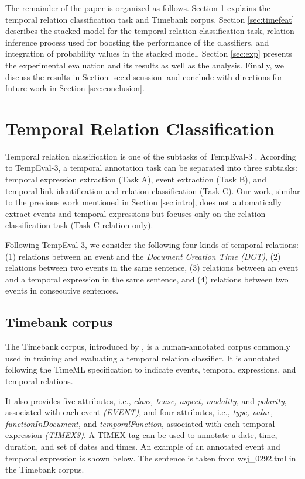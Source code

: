\documentclass[english]{jnlp_1.4}
\begin{document}
The remainder of the paper is organized as follows.
Section \ref{sec:trc} explains the temporal relation classification task and Timebank corpus.
Section \ref{sec:timefeat} describes the stacked model for the temporal relation classification task, relation inference process used for boosting the performance of the classifiers, and integration of probability values in the stacked model.
Section \ref{sec:exp} presents the experimental evaluation and its results as well as the analysis.
Finally, we discuss the results in Section \ref{sec:discussion} and conclude with directions for future work in Section \ref{sec:conclusion}.


\section{Temporal Relation Classification}
\label{sec:trc}

Temporal relation classification is one of the subtasks of TempEval-3 \cite{naushad2013}.
According to TempEval-3, a temporal annotation task can be separated into three subtasks: temporal expression extraction (Task A), event extraction (Task B), and temporal link identification and relation classification (Task C). 
Our work, similar to the previous work mentioned in Section \ref{sec:intro}, does not automatically extract events and temporal expressions but focuses only on the relation classification task (Task C-relation-only).

Following TempEval-3, we consider the following four kinds of temporal relations: 
(1) relations between an event and the \textit{Document Creation Time (DCT)}, 
(2) relations between two events in the same sentence, 
(3) relations between an event and a temporal expression in the same sentence, and 
(4) relations between two events in consecutive sentences.


\subsection{Timebank corpus}
\label{subsec:tb}

The Timebank corpus, introduced by , is a human-annotated corpus commonly used in training and evaluating a temporal relation classifier.
It is annotated following the TimeML specification to indicate events, temporal expressions, and temporal relations.

It also provides five attributes, i.e., \textit{class, tense, aspect, modality,} and \textit{polarity}, associated with each event \textit{\small (EVENT)}, and four attributes, i.e., \textit{type, value, functionInDocument,} and \textit{temporalFunction}, associated with each temporal expression \textit{\small (TIMEX3)}.
A TIMEX tag can be used to annotate a date, time, duration, and set of dates and times. 
An example of an annotated event and temporal expression is shown below.
The sentence is taken from wsj\_0292.tml in the Timebank corpus.
\end{document}

